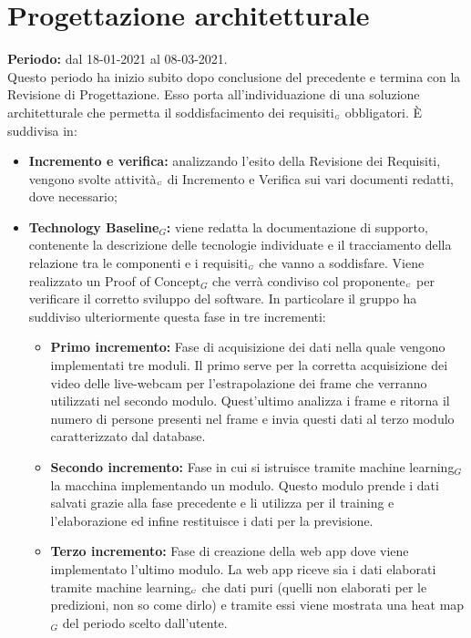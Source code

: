 \section{Progettazione architetturale}\label{PianificazioneProgettazioneArchitetturale}
\textbf{Periodo:} dal 18-01-2021 al 08-03-2021. \\
Questo periodo ha inizio subito dopo conclusione del precedente e termina con la Revisione di Progettazione.
Esso porta all'individuazione di una soluzione architetturale che permetta il soddisfacimento dei requisiti$_{\scaleto{G}{3pt}}$ obbligatori. È suddivisa in:
\begin{itemize}
	\item \textbf{Incremento e verifica:} analizzando l'esito della Revisione dei Requisiti, vengono svolte attività$_{\scaleto{G}{3pt}}$ di Incremento e Verifica sui vari documenti redatti, dove necessario;
	\item \textbf{Technology Baseline$_G$:} viene redatta la documentazione di supporto, contenente la descrizione delle tecnologie individuate e il tracciamento della relazione tra le componenti e i requisiti$_{\scaleto{G}{3pt}}$ che vanno a soddisfare.
	Viene realizzato un Proof of Concept$_G$ che verrà condiviso col proponente$_{\scaleto{G}{3pt}}$ per verificare il corretto sviluppo del software. In particolare il gruppo ha suddiviso ulteriormente questa fase in tre incrementi:
	\begin{itemize}
		\item \textbf{Primo incremento:} Fase di acquisizione dei dati nella quale vengono implementati tre moduli. Il primo serve per la corretta acquisizione dei video delle live-webcam per l'estrapolazione dei frame che verranno utilizzati nel secondo modulo. Quest'ultimo analizza i frame e ritorna il numero di persone presenti nel frame e invia questi dati al terzo modulo caratterizzato dal database.
		\item \textbf{Secondo incremento:} Fase in cui si istruisce tramite machine learning$_G$ la macchina implementando un modulo. Questo modulo prende i dati salvati grazie alla fase precedente e li utilizza per il training e l'elaborazione ed infine restituisce i dati per la previsione. 
		\item \textbf{Terzo incremento:} Fase di creazione della web app dove viene implementato l'ultimo modulo. La web app riceve sia i dati elaborati tramite machine learning$_{\scaleto{G}{3pt}}$ che dati puri (quelli non elaborati per le predizioni, non so come dirlo) e tramite essi viene mostrata una heat map$_G$ del periodo scelto dall'utente.
	\end{itemize}
\end{itemize}
